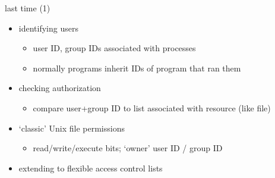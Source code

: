 \date{}
\title{}
\date{}

\begin{frame}
    \titlepage
\end{frame}

\begin{frame}{last time (1)}
    \begin{itemize}
    \item identifying users
        \begin{itemize}
        \item user ID, group IDs associated with processes
        \item normally programs inherit IDs of program that ran them
        \end{itemize}
    \item checking authorization
        \begin{itemize}
        \item compare user+group ID to list associated with resource (like file)
        \end{itemize}
    \item `classic' Unix file permissions
        \begin{itemize}
        \item read/write/execute bits; `owner' user ID / group ID
        \end{itemize}
    \item extending to flexible access control lists
    \end{itemize}
\end{frame}

